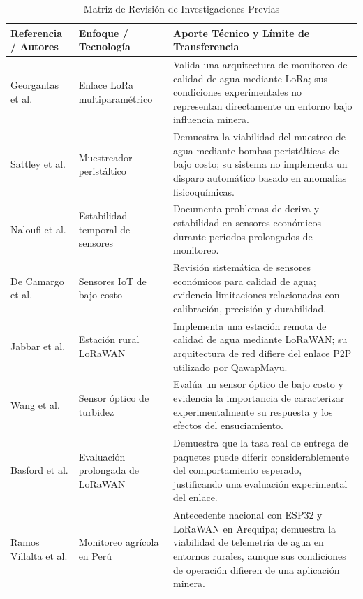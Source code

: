 \documentclass[11pt,a4paper]{article}
\begin{document}
{\small
\begin{longtable}{p{3.8cm}p{3.2cm}p{7.8cm}}

\caption{Matriz de Revisión de Investigaciones Previas}
\label{tab:estado_arte} \\

\toprule
Referencia / Autores &
Enfoque / Tecnología &
Aporte Técnico y Límite de Transferencia \\
\midrule
\endhead

Georgantas et al. \cite{georgantas} &
Enlace LoRa multiparamétrico &
Valida una arquitectura de monitoreo de calidad de agua mediante LoRa; sus condiciones experimentales no representan directamente un entorno bajo influencia minera. \\

Sattley et al. \cite{sattley} &
Muestreador peristáltico &
Demuestra la viabilidad del muestreo de agua mediante bombas peristálticas de bajo costo; su sistema no implementa un disparo automático basado en anomalías fisicoquímicas. \\

Naloufi et al. \cite{naloufi} &
Estabilidad temporal de sensores &
Documenta problemas de deriva y estabilidad en sensores económicos durante periodos prolongados de monitoreo. \\

De Camargo et al. \cite{camargo} &
Sensores IoT de bajo costo &
Revisión sistemática de sensores económicos para calidad de agua; evidencia limitaciones relacionadas con calibración, precisión y durabilidad. \\

Jabbar et al. \cite{jabbar} &
Estación rural LoRaWAN &
Implementa una estación remota de calidad de agua mediante LoRaWAN; su arquitectura de red difiere del enlace P2P utilizado por QawapMayu. \\

Wang et al. \cite{wang} &
Sensor óptico de turbidez &
Evalúa un sensor óptico de bajo costo y evidencia la importancia de caracterizar experimentalmente su respuesta y los efectos del ensuciamiento. \\

Basford et al. \cite{basford} &
Evaluación prolongada de LoRaWAN &
Demuestra que la tasa real de entrega de paquetes puede diferir considerablemente del comportamiento esperado, justificando una evaluación experimental del enlace. \\

Ramos Villalta et al. \cite{ramos} &
Monitoreo agrícola en Perú &
Antecedente nacional con ESP32 y LoRaWAN en Arequipa; demuestra la viabilidad de telemetría de agua en entornos rurales, aunque sus condiciones de operación difieren de una aplicación minera. \\

\bottomrule

\end{longtable}
}
\end{document}
